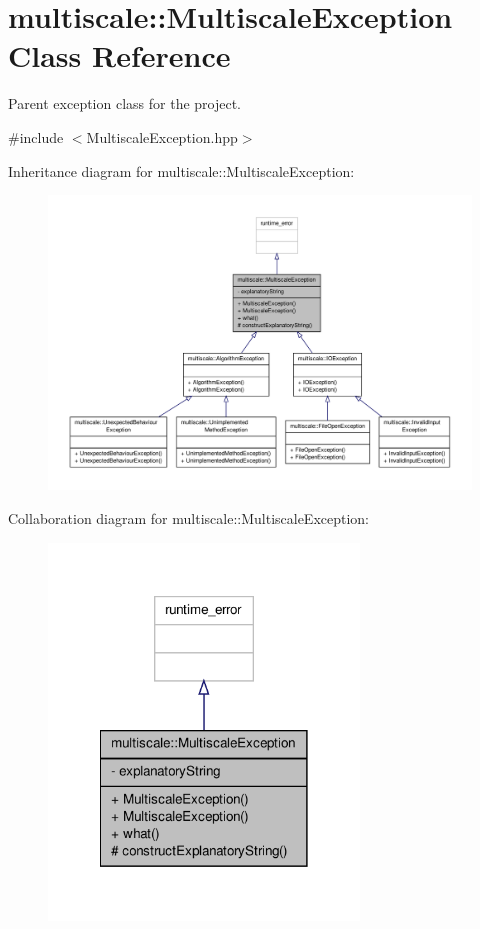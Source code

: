 \hypertarget{classmultiscale_1_1MultiscaleException}{\section{multiscale\-:\-:Multiscale\-Exception Class Reference}
\label{classmultiscale_1_1MultiscaleException}
}


Parent exception class for the project.  




{\ttfamily \#include $<$Multiscale\-Exception.\-hpp$>$}



Inheritance diagram for multiscale\-:\-:Multiscale\-Exception\-:
\nopagebreak
\begin{figure}[H]
\begin{center}
\leavevmode
\includegraphics[width=350pt]{classmultiscale_1_1MultiscaleException__inherit__graph}
\end{center}
\end{figure}


Collaboration diagram for multiscale\-:\-:Multiscale\-Exception\-:
\nopagebreak
\begin{figure}[H]
\begin{center}
\leavevmode
\includegraphics[width=234pt]{classmultiscale_1_1MultiscaleException__coll__graph}
\end{center}
\end{figure}
